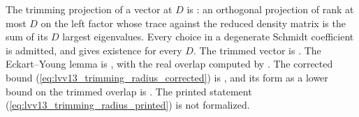 \documentclass{article}
\begin{document}
The trimming projection of a vector at $D$ is
: an orthogonal projection of rank at
most $D$ on the left factor whose trace against the reduced density matrix
is the sum of its $D$ largest eigenvalues. Every choice in a degenerate
Schmidt coefficient is admitted, and 
gives existence for every $D$. The trimmed vector is
. The Eckart--Young lemma is
,
with the real overlap computed by
. The corrected
bound (\ref{eq:lvv13_trimming_radius_corrected}) is
, and its
form as a lower bound on the trimmed overlap is
.
The printed statement (\ref{eq:lvv13_trimming_radius_printed}) is not
formalized.



\end{document}
